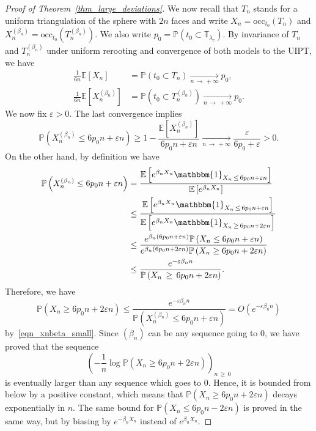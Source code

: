 \documentclass[AHL,Unicode,longabstracts,published]{cedram}
\newcommand{\eps}{\varepsilon}
\newcommand{\TT}{\mathbb{T}}
\newcommand{\E}{\mathbb{E}}
\renewcommand{\P}{\mathbb{P}}
\newcommand{\occ}{\mathrm{occ}}
\newcommand{\bbmun}{\mathbbm{1}}
\begin{document}
\begin{proof}[Proof of Theorem~\ref{thm_large_deviations}]
We now recall that $T_n$ stands for a uniform triangulation of the sphere with $2n$ faces and write $X_n=\occ_{t_0}(T_n)$ and $X_n^{(\beta_n)}=\occ_{t_0}(T_n^{(\beta_n)})$. We also write $p_0=\P (t_0 \subset \TT_{\lambda_c} )$. By invariance of $T_n$ and $T_n^{(\beta_n)}$ under uniform rerooting and convergence of both models to the UIPT, we have
\begin{align*}
\frac{1}{6n} \E \left[X_n \right] &= \P \left(t_0 \subset T_n \right) \xrightarrow[n\,\to\,+\infty]{} p_0,
\\
\frac{1}{6n} \E \left[X_n^{(\beta_n)} \right] &= \P \left(t_0 \subset T_n^{(\beta_n)} \right) \xrightarrow[n\,\to\,+\infty]{} p_0.
\end{align*}
We now fix $\eps>0$. The last convergence implies
\begin{equation}\label{eqn_xnbeta_small}
\P \left(X_n^{(\beta_n)} \leq 6 p_0 n + \eps n \right) \geq 1-\frac{\E \left[X_n^{(\beta_n)} \right]}{6p_0 n+\eps n} \xrightarrow[n\,\to\,
+\infty]{} \frac{\eps}{6p_0+\eps} >0.
\end{equation}
On the other hand, by definition we have
\begin{align*}
\P \left(X_n^{(\beta_n)} \leq 6 p_0 n + \eps n \right) &= \frac{\E \left[e^{\beta_n X_n} \bbmun_{X_n\,\leq\,6 p_0 n + \eps n} \right]}{\E \left[e^{\beta_n X_n} \right]}\\
& \leq \frac{\E \left[e^{\beta_n X_n} \bbmun_{X_n \,\leq\,6 p_0 n + \eps n} \right]}{\E \left[e^{\beta_n X_n} \bbmun_{X_n\,\geq\,6 p_0 n + 2 \eps n} \right]}\\
& \leq \frac{e^{\beta_n\left(6p_0n+\eps n\right)} \P \left(X_n \leq 6p_0n+\eps n \right)}{e^{\beta_n\left(6p_0n+2\eps n\right)} \P \left(X_n \geq 6p_0n+2\eps n \right)}\\
& \leq \frac{e^{-\eps \beta_n n}}{\P \left(X_n\, \geq\,6p_0n+2\eps n \right)}.
\end{align*}
Therefore, we have
\[
\P \left(X_n \geq 6p_0n+2\eps n \right) \leq \frac{e^{-\eps \beta_n n}}{\P \left(X_n^{(\beta_n)} \leq 6 p_0 n + \eps n \right)} = O \left(e^{-\eps \beta_n n} \right)
\]
by~\eqref{eqn_xnbeta_small}. Since $(\beta_n)$ can be any sequence going to $0$, we have proved that the sequence
\[
\left(-\frac{1}{n} \log \P \left(X_n \geq 6p_0n+2\eps n \right) \right)_{n\,\geq\,0}
\]
is eventually larger than any sequence which goes to $0$. Hence, it is bounded from below by a positive constant, which means that $\P (X_n \geq 6p_0n+2\eps n)$ decays exponentially in $n$. The same bound for $\P (X_n \leq 6p_0n-2\eps n)$ is proved in the same way, but by biasing by $e^{-\beta_n X_n}$ instead of $e^{\beta_n X_n}$.
\end{proof}
\end{document}

